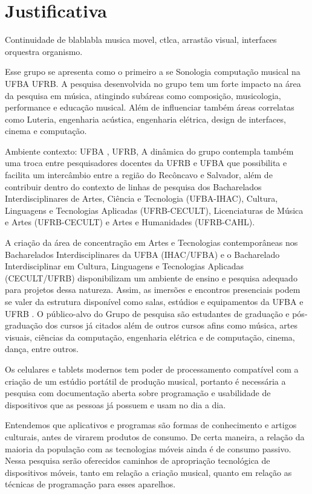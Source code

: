 \documentclass[
	12pt,				%
	openright,			%
	twoside,			%
	a4paper,			%
	english,			%
	french,				%
	spanish,			%
	brazil,				%
	]{abntex2}
\begin{document}
\chapter{Justificativa}

Continuidade de blablabla musica movel, ctlca, arrastão visual, interfaces orquestra organismo.


Esse grupo se apresenta como o primeiro a se Sonologia computação musical na UFBA UFRB. A pesquisa desenvolvida no grupo tem um forte impacto na área da pesquisa em música, atingindo subáreas como composição, musicologia, performance e educação musical. Além de influenciar também áreas correlatas como Luteria, engenharia acústica, engenharia elétrica, design de interfaces, cinema e computação. 

Ambiente contexto: UFBA , UFRB, A dinâmica do grupo contempla também uma troca entre pesquisadores docentes da UFRB e UFBA que possibilita e facilita um intercâmbio entre a região do Recôncavo e Salvador, além de contribuir dentro do contexto de linhas de pesquisa dos Bacharelados Interdisciplinares de Artes, Ciência e Tecnologia (UFBA-IHAC), Cultura, Linguagens e Tecnologias Aplicadas (UFRB-CECULT), Licenciaturas de Música e Artes (UFRB-CECULT) e Artes e Humanidades (UFRB-CAHL).

A criação da área de concentração em Artes e Tecnologias contemporâneas nos Bacharelados Interdisciplinares da UFBA (IHAC/UFBA) e o Bacharelado Interdisciplinar em Cultura, Linguagens e Tecnologias Aplicadas (CECULT/UFRB) disponibilizam um ambiente de ensino e pesquisa adequado para projetos dessa natureza. Assim, as imersões e encontros presenciais podem se valer da estrutura disponível como salas, estúdios e equipamentos da UFBA e UFRB . O público-alvo do Grupo de pesquisa são estudantes de graduação e pós-graduação dos cursos já citados além de outros cursos afins como música, artes visuais, ciências da computação, engenharia elétrica e de computação, cinema, dança, entre outros.

Os celulares e tablets modernos tem poder de processamento compatível com a criação de um estúdio portátil de produção musical, portanto é necessária a pesquisa com documentação aberta sobre programação e usabilidade de dispositivos que as pessoas já possuem e usam no dia a dia.

Entendemos que aplicativos e programas são formas de conhecimento e artigos culturais, antes de virarem produtos de consumo. De certa maneira, a relação da maioria da população com as tecnologias móveis ainda é de consumo passivo. Nessa pesquisa serão oferecidos caminhos de apropriação tecnológica de dispositivos móveis, tanto em relação a criação musical, quanto em relação as técnicas de programação para esses aparelhos.
\end{document}
